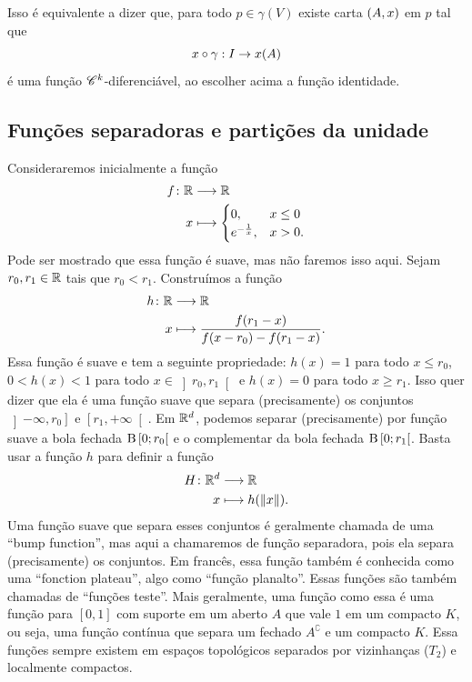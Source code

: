 Isso é equivalente a dizer que, para todo $p \in \gamma(V)$ existe carta $(A,x)$ em $p$ tal que
	\begin{equation*}
	x \circ \gamma: I \to x(A)
	\end{equation*}
é uma função $\mathscr{C}^k$-diferenciável, ao escolher acima a função identidade.

\subsection{Funções separadoras e partições da unidade}

Consideraremos inicialmente a função
	\begin{align*}
	{f}\colon {\mathbb{R}} &\longrightarrow {\mathbb{R}} \\{x} &\longmapsto \begin{cases}
		0,& x \leq 0 \\
		e^{-\frac{1}{x}},& x > 0.
	\end{cases}
	\end{align*}
Pode ser mostrado que essa função é suave, mas não faremos isso aqui. Sejam $r_0,r_1 \in \mathbb{R}$ tais que $r_0 < r_1$. Construímos a função
	\begin{align*}
	{h}\colon {\mathbb{R}} &\longrightarrow {\mathbb{R}} \\{x} &\longmapsto \frac{f(r_1-x)}{f(x-r_0)-f(r_1-x)}.
	\end{align*}
Essa função é suave e tem a seguinte propriedade: $h(x)=1$ para todo $x \leq r_0$, $0 < h(x) < 1$ para todo $x \in \left ]r_0, r_1\right [$ e $h(x)=0$ para todo $x \geq r_1$. Isso quer dizer que ela é uma função suave que separa (precisamente) os conjuntos $\left ]-\infty,r_0\right ]$ e $\left [r_1,+\infty\right [$. Em $\mathbb{R}^d$, podemos separar (precisamente) por função suave a bola fechada $\mathrm{B}\left[{0};{r_0}\right[$ e o complementar da bola fechada $\mathrm{B}\left[{0};{r_1}\right[$. Basta usar a função $h$ para definir a função%
	\begin{align*}
	{H}\colon {\mathbb{R}^d} &\longrightarrow {\mathbb{R}} \\{x} &\longmapsto h(\left\Vert{x}\right\Vert).
	\end{align*}
Uma função suave que separa esses conjuntos é geralmente chamada de uma ``bump function'', mas aqui a chamaremos de função separadora, pois ela separa (precisamente) os conjuntos. Em francês, essa função também é conhecida como uma ``fonction plateau'', algo como ``função planalto''. Essas funções são também chamadas de ``funções teste''.
Mais geralmente, uma função como essa é uma função para $[0,1]$ com suporte em um aberto $A$ que vale $1$ em um compacto $K$, ou seja, uma função contínua que separa um fechado $A^\complement$ e um compacto $K$. Essa funções sempre existem em espaços topológicos separados por vizinhanças ($T_2$) e localmente compactos.

